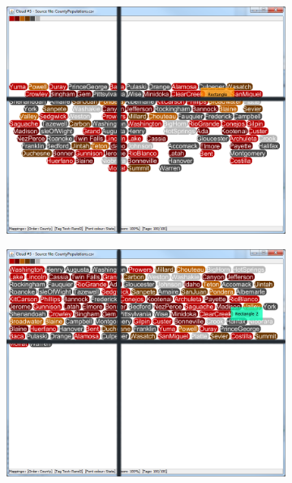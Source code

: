 \begin{figure}[!htb]
\begin{subfigure}{.5\textwidth}
  \includegraphics[scale=0.25]{Experiment2/T3/M2Spiral.png}
\end{subfigure}%
\begin{subfigure}{.5\textwidth}
  \centering
 \includegraphics[scale=0.25]{Experiment2/T3/M2Typewriter.png}
\end{subfigure}
\begin{subfigure}{.5\textwidth}
  \centering

\end{subfigure}
\end{figure}
